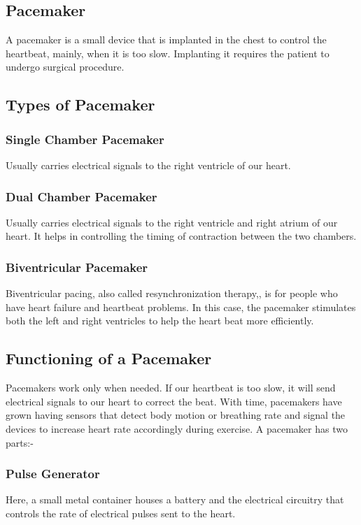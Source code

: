 \documentclass[12pt]{article}
\begin{document}
\begin{normalsize}
\section{Pacemaker}
\raggedright
A pacemaker is a small device that is implanted in the chest to control the heartbeat, mainly, when it is too slow. Implanting it requires the patient to undergo surgical procedure.

\subsection{Types of Pacemaker}

\subsubsection{Single Chamber Pacemaker}
Usually carries electrical signals to the right ventricle of our heart.

\subsubsection{Dual Chamber Pacemaker}
Usually carries electrical signals to the right ventricle and right atrium of our heart. It helps in controlling the timing of contraction between the two chambers.

\subsubsection{Biventricular Pacemaker}
Biventricular pacing, also called resynchronization therapy,, is for people who have heart failure and heartbeat problems. In this case, the pacemaker stimulates both the left and right ventricles to help the heart beat more efficiently.

\subsection{Functioning of a Pacemaker}
Pacemakers work only when needed. If our heartbeat is too slow, it will send electrical signals to our heart to correct the beat. With time, pacemakers have grown having sensors that detect body motion or breathing rate and signal the devices to increase heart rate accordingly during exercise.
\linebreak
\linebreak
A pacemaker has two parts:-
\subsubsection{Pulse Generator}
Here, a small metal container houses a battery and the electrical circuitry that controls the rate of electrical pulses sent to the heart.


\end{normalsize}
\end{document}

